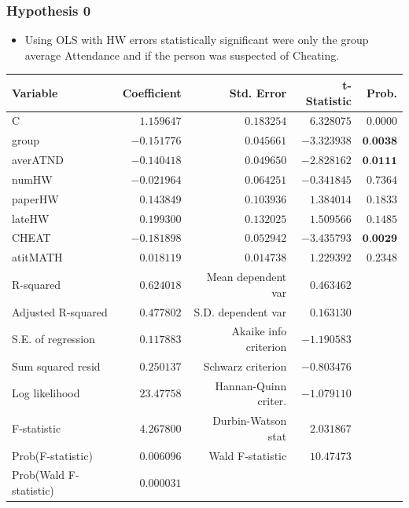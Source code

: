 \documentclass{beamer} %
\theoremstyle{definition}
\begin{document}
		\begin{frame}
		\frametitle{Hypothesis 0}
		\centering
		\begin{itemize}
			\item Using OLS with HW errors statistically significant were only the group average Attendance and if the person was suspected of Cheating.
		\end{itemize}
		\vspace{1em}
		\begin{table}[!htbp]
			\centering
			\tiny
			\begin{tabular}{lrrrr}
				\hline
				Variable & Coefficient & Std. Error & t-Statistic & Prob. \\
				\hline
				C & $1.159647$  & $0.183254$  & $6.328075$  & $0.0000$ \\
				group & $-0.151776$ & $0.045661$  & $-3.323938$ & $\textbf{0.0038}$ \\
				averATND & $-0.140418$ & $0.049650$  & $-2.828162$ & $\textbf{0.0111}$ \\
				numHW & $-0.021964$ & $0.064251$  & $-0.341845$ & $0.7364$ \\
				paperHW & $0.143849$  & $0.103936$  & $1.384014$  & $0.1833$ \\
				lateHW & $0.199300$  & $0.132025$  & $1.509566$  & $0.1485$ \\
				CHEAT & $-0.181898$ & $0.052942$  & $-3.435793$ & $\textbf{0.0029}$ \\
				atitMATH & $0.018119$  & $0.014738$  & $1.229392$  & $0.2348$ \\
				\hline
				R-squared & $0.624018$ & Mean dependent var & $0.463462$ &  \\
				Adjusted R-squared & $0.477802$ & S.D. dependent var & $0.163130$ &  \\
				S.E. of regression & $0.117883$ & Akaike info criterion & $-1.190583$ &  \\
				Sum squared resid & $0.250137$ & Schwarz criterion & $-0.803476$ &  \\
				Log likelihood & $23.47758$ & Hannan-Quinn criter. & $-1.079110$ &  \\
				F-statistic & $4.267800$ & Durbin-Watson stat & $2.031867$ &  \\
				Prob(F-statistic) & $0.006096$ & Wald F-statistic & $10.47473$ &  \\
				Prob(Wald F-statistic) & $0.000031$ &  &  &  \\
				\hline
			\end{tabular}
		\end{table}
		
	\end{frame}
	
\end{document}
